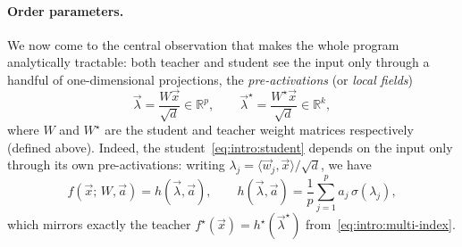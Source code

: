 \paragraph{Order parameters.}
We now come to the central observation that makes the whole program analytically
tractable: both teacher and student see the input only through a handful of
one-dimensional projections, the \emph{pre-activations} (or \emph{local fields})
\begin{equation}
\label{eq:intro:preactivations}
    \vec{\lambda} = \frac{W \vec{x}}{\sqrt{d}} \in \mathbb{R}^p, \qquad
    \vec{\lambda}^\star = \frac{W^\star \vec{x}}{\sqrt{d}} \in \mathbb{R}^k,
\end{equation}
where $W$ and $W^\star$ are the student and teacher weight matrices respectively
(defined above).
Indeed, the student~\eqref{eq:intro:student} depends on the input only through its
own pre-activations: writing $\lambda_j = \langle \vec{w}_j, \vec{x}\rangle/\sqrt{d}$, we have
\begin{equation}
\label{eq:intro:student-preactivations}
    f(\vec{x};\, W, \vec{a}) = h(\vec{\lambda}, \vec{a}), \qquad
    h(\vec{\lambda}, \vec{a}) = \frac{1}{p}\sum_{j=1}^p a_j\,\sigma(\lambda_j),
\end{equation}
which mirrors exactly the teacher $f^\star(\vec{x}) = h^\star(\vec{\lambda}^\star)$
from~\eqref{eq:intro:multi-index}.

